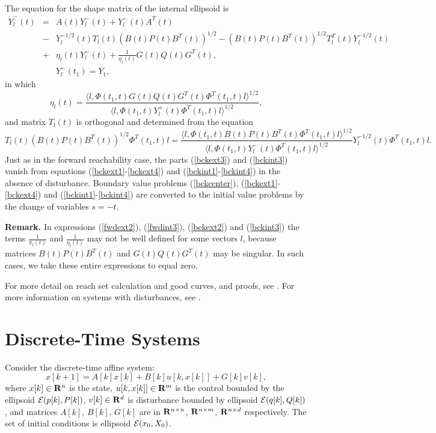 \documentclass{report}
\newcommand{\EE}{{\cal E}}
\begin{document}
The equation for the shape matrix of the internal ellipsoid is
\begin{eqnarray}
\dot{Y}^-_l(t) & = & A(t)Y^-_l(t) + Y^-_l(t)A^T(t) \label{bckint1} \\
& - & Y_l^{-1/2}(t)T_l(t)(B(t)P(t)B^T(t))^{1/2} -
(B(t)P(t)B^T(t))^{1/2}T_l^T(t)Y_l^{-1/2}(t) \label{bckint2} \\
& + & \eta_l(t)Y^-_l(t) + \frac{1}{\eta_l(t)}G(t)Q(t)G^T(t), \label{bckint3} \\
& & Y^-_l(t_1) = Y_1, \label{bckint4}
\end{eqnarray}
in which
\[ \eta_l(t) = \frac{\langle l,
\Phi(t_1,t)G(t)Q(t)G^T(t)\Phi^T(t_1,t)l\rangle^{1/2}}{\langle l,
\Phi(t_1,t)Y^+_l(t)\Phi^T(t_1,t)l\rangle^{1/2}}, \]
and matrix $T_l(t)$ is orthogonal and determined from the equation
\[ T_l(t)(B(t)P(t)B^T(t))^{1/2}\Phi^T(t_1,t)l = \frac{\langle l,
\Phi(t_1,t)B(t)P(t)B^T(t)\Phi^T(t_1,t)l\rangle^{1/2}}{\langle l,
\Phi(t_1,t)Y_l^-(t)\Phi^T(t_1,t)l\rangle^{1/2}}Y_l^{-1/2}(t)\Phi^T(t_1,t)l. \]
Just as in the forward reachability case, the parts (\ref{bckext3}) and
(\ref{bckint3}) vanish from  equations (\ref{bckext1}-\ref{bckext4}) and
(\ref{bckint1}-\ref{bckint4}) in the absence of disturbance.
Boundary value problems (\ref{bckcenter}), (\ref{bckext1}-\ref{bckext4})
and (\ref{bckint1}-\ref{bckint4}) are converted to the initial value
problems by the change of variables $s = -t$.

{\bf Remark.} In expressions (\ref{fwdext2}), (\ref{fwdint3}),
(\ref{bckext2}) and (\ref{bckint3}) the terms $\frac{1}{\pi_l(t)}$
and $\frac{1}{\eta_l(t)}$ may not be well defined for some vectors $l$,
because matrices $B(t)P(t)B^T(t)$ and $G(t)Q(t)G^T(t)$ may be singular.
In such cases, we take these entire expressions to equal zero.

For more detail on reach set calculation and good curves, and proofs, see
\cite{kurvar, varaiya}. For more information on systems
with disturbances, see \cite{kurvar1,kurvar2}.



\section{Discrete-Time Systems}
Consider the discrete-time affine system:
\begin{equation}
x[k+1] = A[k]x[k] + B[k]u[k,x[k]] + G[k]v[k], \label{dtsystem}
\end{equation}
where $x[k]\in{\bf R}^n$ is the state, $u[k,x[k]]\in{\bf R}^m$ is the control
bounded by the ellipsoid $\EE(p[k],P[k])$,
$v[k]\in{\bf R}^d$ is disturbance bounded by ellipsoid $\EE(q[k],Q[k])$,
and matrices $A[k]$, $B[k]$, $G[k]$ are in ${\bf R}^{n\times n}$,
${\bf R}^{n\times m}$, ${\bf R}^{n\times d}$ respectively.
The set of initial conditions is ellipsoid $\EE(x_0,X_0)$.
\end{document}
